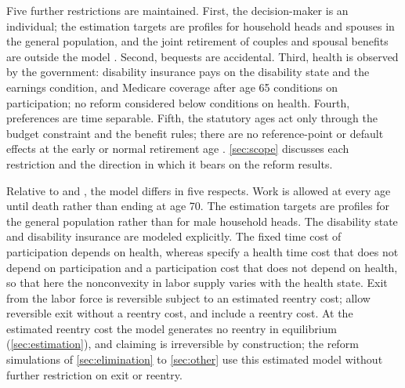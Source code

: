 Five further restrictions are maintained. First, the decision-maker is an individual; the estimation targets are profiles for household heads and spouses in the general population, and the joint retirement of couples and spousal benefits are outside the model \citep{Borella2023}. Second, bequests are accidental. Third, health is observed by the government: disability insurance pays on the disability state and the earnings condition, and Medicare coverage after age 65 conditions on participation; no reform considered below conditions on health. Fourth, preferences are time separable. Fifth, the statutory ages act only through the budget constraint and the benefit rules; there are no reference-point or default effects at the early or normal retirement age \citep{seibold2021reference}. \autoref{sec:scope} discusses each restriction and the direction in which it bears on the reform results.

Relative to \citet{french2005effects} and \citet{french2011effects}, the model differs in five respects. %
Work is allowed at every age until death rather than ending at age 70. %
The estimation targets are profiles for the general population rather than for male household heads. %
The disability state and disability insurance are modeled explicitly. %
The fixed time cost of participation depends on health, whereas \citet{french2011effects} specify a health time cost that does not depend on participation and a participation cost that does not depend on health, so that here the nonconvexity in labor supply varies with the health state. %
Exit from the labor force is reversible subject to an estimated reentry cost; \citet{french2005effects} allow reversible exit without a reentry cost, and \citet{french2011effects} include a reentry cost. %
At the estimated reentry cost the model generates no reentry in equilibrium (\autoref{sec:estimation}), and claiming is irreversible by construction; the reform simulations of \autoref{sec:elimination} to \autoref{sec:other} use this estimated model without further restriction on exit or reentry. %
